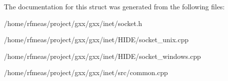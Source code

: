 The documentation for this struct was generated from the following files\+:\begin{DoxyCompactItemize}
\item 
/home/rfmeas/project/gxx/gxx/inet/socket.\+h\item 
/home/rfmeas/project/gxx/gxx/inet/\+H\+I\+D\+E/socket\+\_\+unix.\+cpp\item 
/home/rfmeas/project/gxx/gxx/inet/\+H\+I\+D\+E/socket\+\_\+windows.\+cpp\item 
/home/rfmeas/project/gxx/gxx/inet/src/common.\+cpp\end{DoxyCompactItemize}
